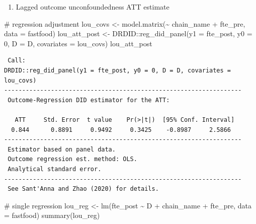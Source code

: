 \documentclass[
  letterpaper,
  DIV=11,
  numbers=noendperiod]{scrreprt}
\newenvironment{Shaded}{\begin{snugshade}}{\end{snugshade}}
\newcommand{\AttributeTok}[1]{\textcolor[rgb]{0.40,0.45,0.13}{#1}}
\newcommand{\CommentTok}[1]{\textcolor[rgb]{0.37,0.37,0.37}{#1}}
\newcommand{\DecValTok}[1]{\textcolor[rgb]{0.68,0.00,0.00}{#1}}
\newcommand{\FunctionTok}[1]{\textcolor[rgb]{0.28,0.35,0.67}{#1}}
\newcommand{\NormalTok}[1]{\textcolor[rgb]{0.00,0.23,0.31}{#1}}
\newcommand{\OtherTok}[1]{\textcolor[rgb]{0.00,0.23,0.31}{#1}}
\newcommand{\SpecialCharTok}[1]{\textcolor[rgb]{0.37,0.37,0.37}{#1}}
\providecommand{\tightlist}{%
  \setlength{\itemsep}{0pt}\setlength{\parskip}{0pt}}\usepackage{longtable,booktabs,array}
\begin{document}
\begin{enumerate}
\def\labelenumi{\arabic{enumi}.}
\setcounter{enumi}{3}
\tightlist
\item
  Lagged outcome unconfoundedness ATT estimate
\end{enumerate}

\begin{Shaded}
\begin{Highlighting}[]
\CommentTok{\# regression adjustment}
\NormalTok{lou\_covs }\OtherTok{\textless{}{-}} \FunctionTok{model.matrix}\NormalTok{(}\SpecialCharTok{\textasciitilde{}}\NormalTok{ chain\_name }\SpecialCharTok{+}\NormalTok{ fte\_pre, }\AttributeTok{data =}\NormalTok{ fastfood)}
\NormalTok{lou\_att\_post }\OtherTok{\textless{}{-}}\NormalTok{ DRDID}\SpecialCharTok{::}\FunctionTok{reg\_did\_panel}\NormalTok{(}\AttributeTok{y1 =}\NormalTok{ fte\_post, }\AttributeTok{y0 =} \DecValTok{0}\NormalTok{, }\AttributeTok{D =}\NormalTok{ D, }\AttributeTok{covariates =}\NormalTok{ lou\_covs)}
\NormalTok{lou\_att\_post}
\end{Highlighting}
\end{Shaded}

\begin{verbatim}
 Call:
DRDID::reg_did_panel(y1 = fte_post, y0 = 0, D = D, covariates = lou_covs)
------------------------------------------------------------------
 Outcome-Regression DID estimator for the ATT:
 
   ATT     Std. Error  t value    Pr(>|t|)  [95% Conf. Interval] 
  0.844      0.8891     0.9492     0.3425    -0.8987     2.5866  
------------------------------------------------------------------
 Estimator based on panel data.
 Outcome regression est. method: OLS.
 Analytical standard error.
------------------------------------------------------------------
 See Sant'Anna and Zhao (2020) for details.
\end{verbatim}

\begin{Shaded}
\begin{Highlighting}[]
\CommentTok{\# single regression}
\NormalTok{lou\_reg }\OtherTok{\textless{}{-}} \FunctionTok{lm}\NormalTok{(fte\_post }\SpecialCharTok{\textasciitilde{}}\NormalTok{ D }\SpecialCharTok{+}\NormalTok{ chain\_name }\SpecialCharTok{+}\NormalTok{ fte\_pre, }\AttributeTok{data =}\NormalTok{ fastfood)}
\FunctionTok{summary}\NormalTok{(lou\_reg)}
\end{Highlighting}
\end{Shaded}
\end{document}
